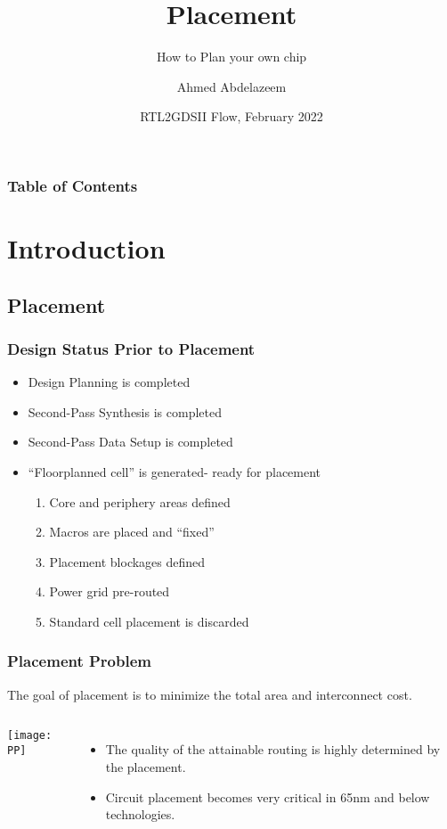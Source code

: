\documentclass[compress]{beamer}
\title[ASIC Physical Design] %
{Placement}
\subtitle{How to Plan your own chip}
\author[Ahmed Abdelazeem] %
{Ahmed Abdelazeem}
\institute[ZU] %
{
	Faculty of Engineering\\
	Zagazig University
}
\date[ZU 2023] %
{RTL2GDSII Flow, February 2022}
\begin{document}
	
	\frame{\titlepage}
	
	
	\begin{frame}
		\frametitle{Table of Contents}
		\tableofcontents
	\end{frame}
\section[Intro]{Introduction}
\subsection[Place]{Placement}
\begin{frame}
	\frametitle{Design Status Prior to Placement}
	\begin{itemize}
		\item Design Planning is completed
		\item Second-Pass Synthesis is completed
		\item Second-Pass Data Setup is completed
		\item “Floorplanned cell” is generated- ready for placement
			\begin{enumerate}
				\item Core and periphery areas defined
				\item Macros are placed and “fixed”
				\item Placement blockages defined
				\item Power grid pre-routed
				\item Standard cell placement is discarded
			\end{enumerate}
	\end{itemize}
\end{frame}	
\begin{frame}
	\frametitle{Placement Problem}
		The goal of placement is to minimize the total area and interconnect cost.
	\begin{columns}	
		\begin{center}
			\texttt{[image: PP]}
		\end{center}
		\begin{itemize}
			\item The quality of the attainable routing is highly determined by the placement.
			\item Circuit placement becomes very critical in  65nm and below technologies. 
		\end{itemize}
	\end{columns}
\end{frame}
\end{document}
